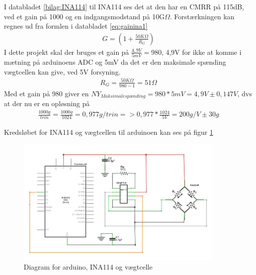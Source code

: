 I databladet \ref{bilag:INA114} til INA114 ses det at den har en CMRR på 115dB, ved et gain på 1000 og en indgangsmodstand på 10G$\Omega$. Forstærkningen kan regnes ud fra formlen i databladet \ref{eq:gainina1}
\begin{align}
 G=(1+\frac{50K\Omega}{R_{G}})
 \label{eq:gainina1}
 \end{align} 
 I dette projekt skal der bruges et gain på $\frac{4,9V}{5mV}=980$, 4,9V for ikke at komme i mætning på arduinoens ADC og 5mV da det er den maksimale spænding vægtcellen kan give, ved 5V forsyning.
 \begin{align}
 R_{G}=\frac{50K\Omega}{980-1}=51\Omega
 \label{eq:gainina2}
 \end{align}
Med et gain på 980 giver en $NY_{Maksimalespænding}=980*5mV=4,9V \pm0,147V$, dvs at der nu er en opløsning på
\begin{align}
 \frac{1000g}{trin}=\frac{1000g}{1024}=0,977g/trin=>0,977*\frac{1024}{5V}=200g/V \pm30g
 \label{eq:gainina3}
 \end{align}
 
 Kredsløbet for INA114 og vægtcellen til arduinoen kan ses på figur \ref{fig:loadcelldiagram}
 
  \begin{figure}[H]
	\centering
	\includegraphics[width=0.9\textwidth]{billeder/Hardware/diagrammer/loadcelldiagram.JPG}
	\caption{Diagram for arduino, INA114 og vægtcelle}
	\label{fig:loadcelldiagram}
\end{figure}


